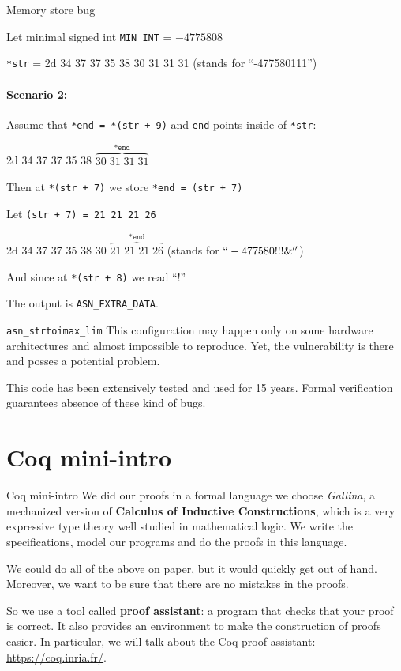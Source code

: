 \documentclass[10pt]{beamer}
\begin{document}
  \begin{frame}{Memory store bug}

    Let minimal signed int \texttt{MIN\_INT} = $-4775808$ 

    \texttt{*str} = {\color{red}2d 34 37 37 35 38 30 31 31 31} (stands for ``-477580111'') 

    \paragraph{{\bf Scenario 2}:}

    Assume that \texttt{*end = *(str + 9)} and \texttt{end} points inside of \texttt{*str}:
    
    {\color{red}2d 34 37 37 35 38 {\color{blue} $\overbrace{30 \; 31 \; 31 \; 31}^{\texttt{*end}}$}}
    

    Then at \texttt{*(str + 7)} we store \texttt{*end = (str + 7)}

     Let \texttt{(str + 7) = 21 21 21 26} 

   
    {\color{red}2d 34 37 37 35 38 30 {\color{blue}$\overbrace{21 \; 21 \; 21 \; 26}^{\texttt{*end}}$}}
    (stands for $``-477580!!!\&''$)

    And since at \texttt{*(str + 8)} we read ``!'' 

    The output is \texttt{ASN\_EXTRA\_DATA}.
    
    \end{frame}



\begin{frame}{\texttt{asn\_strtoimax\_lim}}
   This configuration may happen only on some hardware architectures and almost impossible to reproduce. Yet, the vulnerability is there and posses a potential problem.
   
  This code has been extensively tested and used for 15 years. Formal verification guarantees absence of these kind of bugs.

  

\end{frame}

\section{Coq mini-intro}

\begin{frame}{Coq mini-intro}
  We did our proofs in a formal language we choose {\it Gallina}, a mechanized version of {\bf Calculus of Inductive Constructions}, which is a very expressive type theory well studied in mathematical logic. We write the specifications, model our programs and do the proofs in this language.

  \smallskip
We could do all of the above on paper, but it would quickly get out of hand. Moreover, we want to be sure that there are no mistakes in the proofs.
  
  So we use a tool called {\bf proof assistant}: a program that checks that your proof is correct. It also provides an environment to make the construction of proofs easier. In particular, we will talk about the Coq proof assistant: \url{https://coq.inria.fr/}.
  
  
\end{frame}
\end{document}
